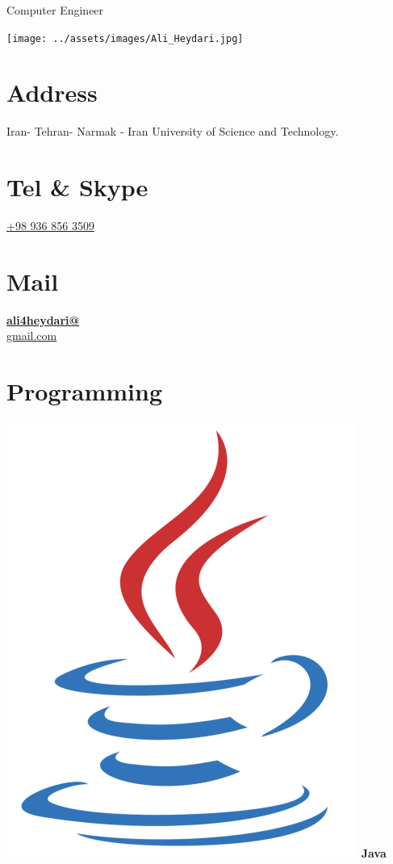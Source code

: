 \documentclass[a4paper]{friggeri-cv}
\begin{document}
      {Computer Engineer}


\begin{aside}
  \texttt{[image: ../assets/images/Ali\_Heydari.jpg]}
  \section{Address}\label{sec:address}
Iran- Tehran- Narmak -
Iran University of Science and Technology.
    ~
  \section{Tel \& Skype}\label{sec:tel&skype}
   \href{tel:+989368563509}{+98 936 856 3509}
    ~
  \section{Mail}\label{sec:mail}
 \href{mailto:ali4heydari@gmail.com}{\textbf{ali4heydari@}\\gmail.com}
    ~
  \section{Programming}\label{sec:programming}
   \includegraphics[scale=0.03]{../assets/images/Java_logo.png} \textbf{Java}%
   

\end{aside}
\end{document}

